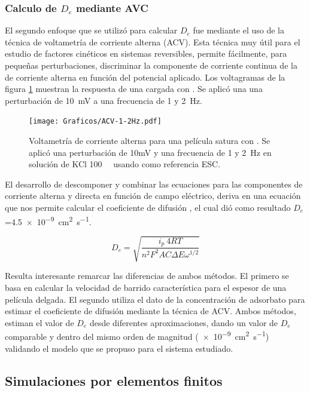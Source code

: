 	 \subsubsection*{Calculo de $D_e$ mediante AVC}

    	 El segundo enfoque que se utilizó para calcular $D_e$ fue mediante el uso de la técnica de voltametría de corriente alterna (ACV). Esta técnica muy útil para el estudio de factores cinéticos en sistemas reversibles, permite fácilmente, para pequeñas perturbaciones, discriminar la componente de corriente continua de la de corriente alterna en función del potencial aplicado. Los voltagramas de la figura \ref{fig:acv} muestran la respuesta de una \pdmF\space cargada con \ru. Se aplicó una una perturbación de \SI{10}{\milli\volt} a una frecuencia de 1 y \SI{2}{\hertz}.

	 			\begin{figure}[ht]
					\centering
			 	    \texttt{[image: Graficos/ACV-1-2Hz.pdf]}
			        \caption[Voltametrías de corriente alterna]{Voltametría de corriente alterna para una película satura con \ru. Se aplicó una perturbación de 10mV y una frecuencia de 1 y \SI{2}{\hertz} en solución de KCl \SI{100}{\milli\Molar} usando como referencia ESC.}
			        \label{fig:acv}
			      	\end{figure}

    	 El desarrollo de descomponer y combinar las ecuaciones para las componentes de corriente alterna y directa en función de campo eléctrico, deriva en una ecuación que nos permite calcular el coeficiente de difusión \cite{Wi2000}, el cual dió como resultado $D_e$=\SI{4.5e-9}{\square\cm\per\second}. 
    	 	
    	 		\begin{equation}
					D_e=\sqrt{\frac{i_p\ 4RT}{n^2 F^2 A C \Delta E \omega ^{1/2}}}
					\label{eq:acv}
				 \end{equation}

		
		 Resulta interesante remarcar las diferencias de ambos métodos. El primero se basa en calcular la velocidad de barrido característica para el espesor de una película delgada. El segundo utiliza el dato de la concentración de adsorbato para estimar el coeficiente de difusión mediante la técnica de ACV. Ambos métodos, estiman el valor de $D_e$ desde diferentes aproximaciones, dando un valor de $D_e$ comparable y dentro del mismo orden de magnitud (\SI{e-9}{\square\cm\per\second}) validando el modelo que se propuso para el sistema estudiado.
			
	\subsection{Simulaciones por elementos finitos}	

